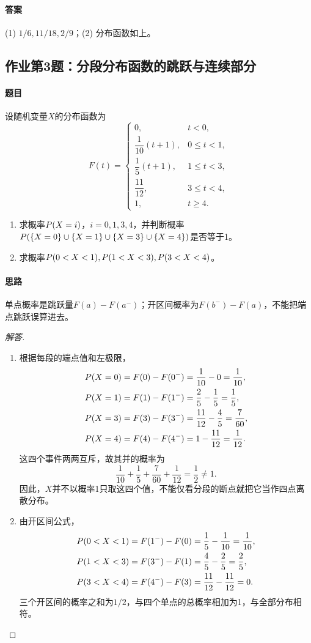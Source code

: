 \paragraph{答案}(1) $1/6,11/18,2/9$；(2) 分布函数如上。

\subsection{作业第3题：分段分布函数的跳跃与连续部分}
\label{ex:w06-h3}
\paragraph{题目}
设随机变量$X$的分布函数为
\[
F(t)=\begin{cases}
0,&t<0,\\
\dfrac1{10}(t+1),&0\leq t<1,\\
\dfrac15(t+1),&1\leq t<3,\\
\dfrac{11}{12},&3\leq t<4,\\
1,&t\geq4.
\end{cases}
\]
\begin{enumerate}
\item 求概率$\P(X=i)$，$i=0,1,3,4$，并判断概率$\P(\{X=0\}\cup\{X=1\}\cup\{X=3\}\cup\{X=4\})$是否等于1。
\item 求概率$\P(0<X<1),\P(1<X<3),\P(3<X<4)$。
\end{enumerate}
\paragraph{思路}单点概率是跳跃量$F(a)-F(a^-)$；开区间概率为$F(b^-)-F(a)$，不能把端点跳跃误算进去。
\begin{proof}[解答]
\begin{enumerate}
\item 根据每段的端点值和左极限，
\begin{align*}
\P(X=0)&=F(0)-F(0^-)=\frac1{10}-0=\frac1{10},\\
\P(X=1)&=F(1)-F(1^-)=\frac25-\frac15=\frac15,\\
\P(X=3)&=F(3)-F(3^-)=\frac{11}{12}-\frac45=\frac7{60},\\
\P(X=4)&=F(4)-F(4^-)=1-\frac{11}{12}=\frac1{12}.
\end{align*}
这四个事件两两互斥，故其并的概率为
\[
\frac1{10}+\frac15+\frac7{60}+\frac1{12}=\frac12\ne1.
\]
因此，$X$并不以概率1只取这四个值，不能仅看分段的断点就把它当作四点离散分布。
\item 由开区间公式，
\begin{align*}
\P(0<X<1)&=F(1^-)-F(0)=\frac15-\frac1{10}=\frac1{10},\\
\P(1<X<3)&=F(3^-)-F(1)=\frac45-\frac25=\frac25,\\
\P(3<X<4)&=F(4^-)-F(3)=\frac{11}{12}-\frac{11}{12}=0.
\end{align*}
三个开区间的概率之和为$1/2$，与四个单点的总概率相加为1，与全部分布相符。
\end{enumerate}
\end{proof}
